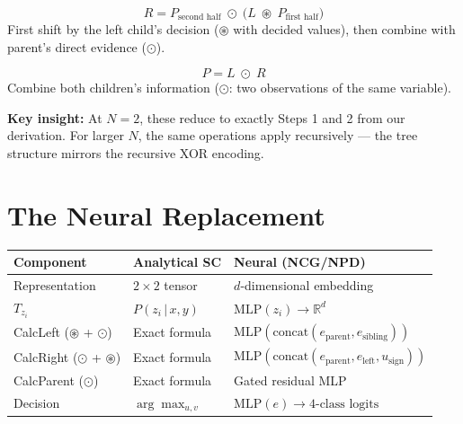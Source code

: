 \documentclass[11pt,a4paper]{article}
\newcommand{\conv}{\circledast}
\newcommand{\nprod}{\odot}
\begin{document}
\begin{tcolorbox}[colback=green!5,colframe=prodgreen,title=CalcRight (going down to right child)]
\[
R = P_{\text{second half}} \;\nprod\; \big(L \;\conv\; P_{\text{first half}}\big)
\]
First shift by the left child's decision ($\conv$ with decided values), then combine with parent's direct evidence ($\nprod$).
\end{tcolorbox}

\begin{tcolorbox}[colback=gray!5,title=CalcParent (going back up)]
\[
P = L \;\nprod\; R
\]
Combine both children's information ($\nprod$: two observations of the same variable).
\end{tcolorbox}

\textbf{Key insight:} At $N=2$, these reduce to exactly Steps 1 and 2 from our derivation. For larger $N$, the same operations apply recursively — the tree structure mirrors the recursive XOR encoding.

\section{The Neural Replacement}

\renewcommand{\arraystretch}{1.4}
\begin{center}
\begin{tabular}{lll}
\toprule
\textbf{Component} & \textbf{Analytical SC} & \textbf{Neural (NCG/NPD)} \\
\midrule
Representation & $2\times 2$ tensor & $d$-dimensional embedding \\
$T_{z_i}$ & $P(z_i \,|\, x, y)$ & $\text{MLP}(z_i) \to \mathbb{R}^d$ \\
CalcLeft ($\conv$ + $\nprod$) & Exact formula & $\text{MLP}(\text{concat}(e_{\text{parent}}, e_{\text{sibling}}))$ \\
CalcRight ($\nprod$ + $\conv$) & Exact formula & $\text{MLP}(\text{concat}(e_{\text{parent}}, e_{\text{left}}, u_{\text{sign}}))$ \\
CalcParent ($\nprod$) & Exact formula & Gated residual MLP \\
Decision & $\arg\max_{u,v}$ & $\text{MLP}(e) \to 4\text{-class logits}$ \\
\bottomrule
\end{tabular}
\end{center}

\bigskip
\end{document}
